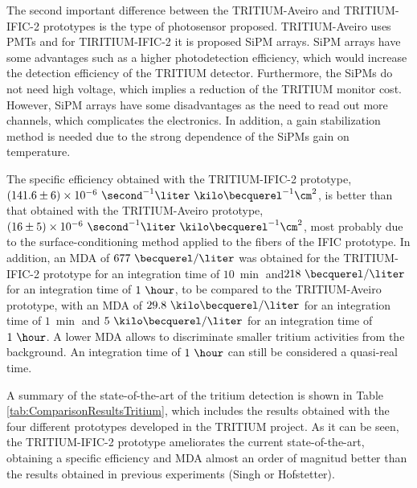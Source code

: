 \begin{enumerate}
The second important difference between the TRITIUM-Aveiro and TRITIUM-IFIC-2 prototypes is the type of photosensor proposed. TRITIUM-Aveiro uses PMTs and for TIRITIUM-IFIC-2 it is proposed SiPM arrays. SiPM arrays have some advantages such as a higher photodetection efficiency, which would increase the detection efficiency of the TRITIUM detector. Furthermore, the SiPMs do not need high voltage, which implies a reduction of the TRITIUM monitor cost. However, SiPM arrays have some disadvantages as the need to read out more channels, which complicates the electronics. In addition, a gain stabilization method is needed due to the strong dependence of the SiPMs gain on temperature.

The specific efficiency obtained with the TRITIUM-IFIC-2 prototype, $(141.6 \pm 6) \times 10^{-6}~ \second^{-1}  \liter ~ \kilo\becquerel^{-1} \cm^2$, is better than that obtained with the TRITIUM-Aveiro prototype, $(16 \pm 5)\times 10^{-6}~ \second^{-1}  \liter ~ \kilo\becquerel^{-1} \cm^2$, most probably due to the surface-conditioning method applied to the fibers of the IFIC prototype. In addition, an MDA of $677~\becquerel/\liter$ was obtained for the TRITIUM-IFIC-2 prototype for an integration time of $10~\min$ and$218~\becquerel/\liter$ for an integration time of $1~\hour$, to be compared to the TRITIUM-Aveiro prototype, with an MDA of $29.8~\kilo\becquerel/\liter$ for an integration time of $1~\min$ and $5~\kilo\becquerel/\liter$ for an integration time of $1~\hour$. A lower MDA allows to discriminate smaller tritium activities from the background. An integration time of $1~\hour$ can still be considered a quasi-real time.

A summary of the state-of-the-art of the tritium detection is shown in Table \ref{tab:ComparisonResultsTritium}, which includes the results obtained with the four different prototypes developed in the TRITIUM project. As it can be seen, the TRITIUM-IFIC-2 prototype ameliorates the current state-of-the-art, obtaining a specific efficiency and MDA almost an order of magnitud better than the results obtained in previous experiments (Singh or Hofstetter).


\end{enumerate}
